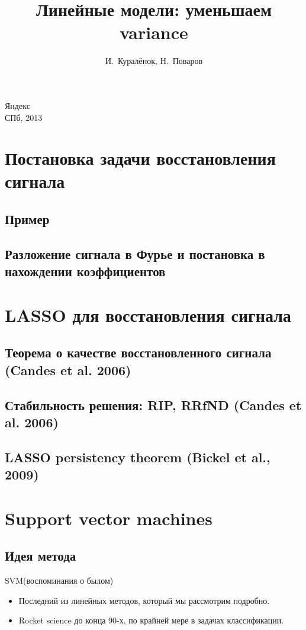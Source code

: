 \documentclass[14pt, fleqn, xcolor={dvipsnames, table}]{beamer}
\title{Линейные модели: уменьшаем variance\\\small{}}
\author[]{\small{%
И.~Куралёнок,
Н.~Поваров}}
\date{}
\begin{document}
\begin{frame}
\maketitle
\small
\begin{center}
\vspace{-60pt}
\normalsize {\color{red}Я}ндекс \\
\vspace{80pt}
\footnotesize СПб, 2013
\end{center}
\end{frame}

\section{Постановка задачи восстановления сигнала}
\subsection{Пример}
\subsection{Разложение сигнала в Фурье и постановка в нахождении коэффициентов}
\section{LASSO для восстановления сигнала}
\subsection{Теорема о качестве восстановленного сигнала (Candes et al. 2006)}
\subsection{Стабильность решения: RIP, RRfND (Candes et al. 2006)}
\subsection{LASSO persistency theorem (Bickel et al., 2009)}
\section{Support vector machines}
\subsection{Идея метода}
\begin{frame}{SVM(воспоминания о былом)}
\begin{itemize}
  \item Последний из линейных методов, который мы рассмотрим подробно.
  \item Rocket science до конца 90-х, по крайней мере в задачах классификации.
\end{itemize}
\end{frame}
\end{document}
